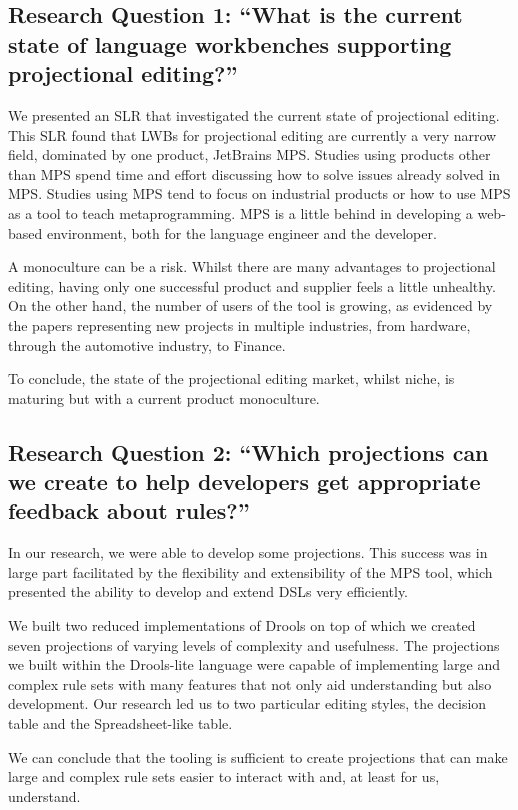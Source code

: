 \subsection{Research Question 1: ``What is the current state of language workbenches supporting projectional editing?''}
We presented an SLR that investigated the current state of projectional editing.
This SLR found that LWBs for projectional editing are currently a very narrow field, dominated by one product, JetBrains MPS.
Studies using products other than MPS spend time and effort discussing how to solve issues already solved in MPS.
Studies using MPS tend to focus on industrial products or how to use MPS as a tool to teach metaprogramming.
MPS is a little behind in developing a web-based environment, both for the language engineer and the developer.

A monoculture can be a risk.
Whilst there are many advantages to projectional editing, having only one successful product and supplier feels a little unhealthy.
On the other hand, the number of users of the tool is growing, as evidenced by the papers representing new projects in multiple industries, from hardware, through the automotive industry, to Finance.

To conclude, the state of the projectional editing market, whilst niche, is maturing but with a current product monoculture.

\subsection{Research Question 2: ``Which projections can we create to help developers get appropriate feedback about rules?''}

In our research, we were able to develop some projections.  
This success was in large part facilitated by the flexibility and extensibility of the MPS tool, which presented the ability to develop and extend DSLs very efficiently.

We built two reduced implementations of Drools on top of which we created seven projections of varying levels of complexity and usefulness.
The projections we built within the Drools-lite language were capable of implementing large and complex rule sets with many features that not only aid understanding but also development.
Our research led us to two particular editing styles, the decision table and the Spreadsheet-like table.

We can conclude that the tooling is sufficient to create projections that can make large and complex rule sets easier to interact with and, at least for us, understand.

